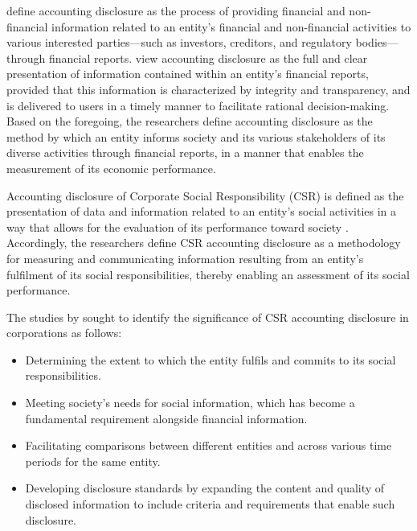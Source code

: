 \documentclass[10pt]{NSP1}
\begin{document}
	\cite{Blankespoor2020, Qatati2013} define accounting disclosure as the process of providing financial and non-financial information related to an entity's financial and non-financial activities to various interested parties—such as investors, creditors, and regulatory bodies—through financial reports. \cite{Malak2023} view accounting disclosure as the full and clear presentation of information contained within an entity's financial reports, provided that this information is characterized by integrity and transparency, and is delivered to users in a timely manner to facilitate rational decision-making. Based on the foregoing, the researchers define accounting disclosure as the method by which an entity informs society and its various stakeholders of its diverse activities through financial reports, in a manner that enables the measurement of its economic performance.
	
	Accounting disclosure of Corporate Social Responsibility (CSR) is defined as the presentation of data and information related to an entity's social activities in a way that allows for the evaluation of its performance toward society \cite{Laila2022, Qassoum2018}. Accordingly, the researchers define CSR accounting disclosure as a methodology for measuring and communicating information resulting from an entity's fulfilment of its social responsibilities, thereby enabling an assessment of its social performance.
	
	The studies by \cite{AbuStala2022, Nabou2021} sought to identify the significance of CSR accounting disclosure in corporations as follows:
	\begin{itemize}
		\item Determining the extent to which the entity fulfils and commits to its social responsibilities.
		\item Meeting society's needs for social information, which has become a fundamental requirement alongside financial information.
		\item Facilitating comparisons between different entities and across various time periods for the same entity.
		\item Developing disclosure standards by expanding the content and quality of disclosed information to include criteria and requirements that enable such disclosure.
	\end{itemize}
	
\end{document}
